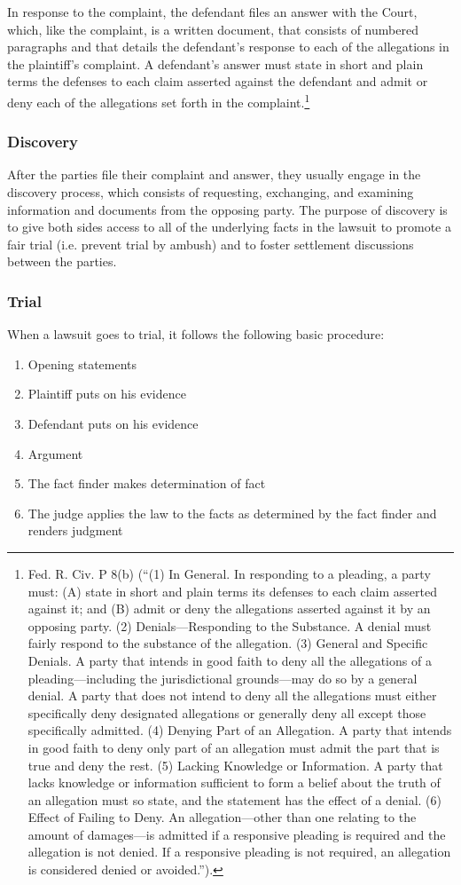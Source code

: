 In response to the complaint, the defendant files an answer with the Court, which, like the complaint, is a written document, that consists of numbered paragraphs and that details the defendant's response to each of the allegations in the plaintiff's complaint.  A defendant's answer must state in short and plain terms the defenses to each claim asserted against the defendant and admit or deny each of the allegations set forth in the complaint.\footnote{Fed. R. Civ. P 8(b) (``(1) In General. In responding to a pleading, a party must: (A) state in short and plain terms its defenses to each claim asserted against it; and (B) admit or deny the allegations asserted against it by an opposing party.  (2) Denials—Responding to the Substance. A denial must fairly respond to the substance of the allegation.  (3) General and Specific Denials. A party that intends in good faith to deny all the allegations of a pleading—including the jurisdictional grounds—may do so by a general denial. A party that does not intend to deny all the allegations must either specifically deny designated allegations or generally deny all except those specifically admitted.  (4) Denying Part of an Allegation. A party that intends in good faith to deny only part of an allegation must admit the part that is true and deny the rest.  (5) Lacking Knowledge or Information. A party that lacks knowledge or information sufficient to form a belief about the truth of an allegation must so state, and the statement has the effect of a denial.  (6) Effect of Failing to Deny. An allegation—other than one relating to the amount of damages—is admitted if a responsive pleading is required and the allegation is not denied. If a responsive pleading is not required, an allegation is considered denied or avoided.'').}

\subsubsection{Discovery}
After the parties file their complaint and answer, they usually engage in the discovery process, which consists of requesting, exchanging, and examining information and documents from the opposing party.  The purpose of discovery is to give both sides access to all of the underlying facts in the lawsuit to promote a fair trial (i.e. prevent trial by ambush) and to foster settlement discussions between the parties.  

\subsubsection{Trial}
When a lawsuit goes to trial, it follows the following basic procedure:
\begin{enumerate}
\item Opening statements
\item Plaintiff puts on his evidence
\item Defendant puts on his evidence
\item Argument
\item The fact finder makes determination of fact
\item The judge applies the law to the facts as determined by the fact finder and renders judgment
\end{enumerate}


